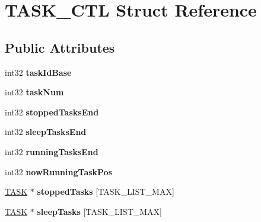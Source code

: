\hypertarget{struct_t_a_s_k___c_t_l}{}\section{T\+A\+S\+K\+\_\+\+C\+T\+L Struct Reference}
\label{struct_t_a_s_k___c_t_l}
\subsection*{Public Attributes}
\begin{DoxyCompactItemize}
\item 
\hypertarget{struct_t_a_s_k___c_t_l_a83f4422e8e6b6985fcd906280152021c}{}int32 {\bfseries task\+Id\+Base}\label{struct_t_a_s_k___c_t_l_a83f4422e8e6b6985fcd906280152021c}

\item 
\hypertarget{struct_t_a_s_k___c_t_l_afe827cc7495142a30211c673e984ffe0}{}int32 {\bfseries task\+Num}\label{struct_t_a_s_k___c_t_l_afe827cc7495142a30211c673e984ffe0}

\item 
\hypertarget{struct_t_a_s_k___c_t_l_abcd453fcf00ecb2a59a537c7a755c90b}{}int32 {\bfseries stopped\+Tasks\+End}\label{struct_t_a_s_k___c_t_l_abcd453fcf00ecb2a59a537c7a755c90b}

\item 
\hypertarget{struct_t_a_s_k___c_t_l_a2db7a15b051b387129d1a3fe9b9f379a}{}int32 {\bfseries sleep\+Tasks\+End}\label{struct_t_a_s_k___c_t_l_a2db7a15b051b387129d1a3fe9b9f379a}

\item 
\hypertarget{struct_t_a_s_k___c_t_l_a51ed809edddd6e44c3c3480fe37e764d}{}int32 {\bfseries running\+Tasks\+End}\label{struct_t_a_s_k___c_t_l_a51ed809edddd6e44c3c3480fe37e764d}

\item 
\hypertarget{struct_t_a_s_k___c_t_l_ae9de4564884d3a5f4766b85af6645121}{}int32 {\bfseries now\+Running\+Task\+Pos}\label{struct_t_a_s_k___c_t_l_ae9de4564884d3a5f4766b85af6645121}

\item 
\hypertarget{struct_t_a_s_k___c_t_l_a80753f61d7fe47df1e5bf12ca9412b68}{}\hyperlink{struct_t_a_s_k}{T\+A\+S\+K} $\ast$ {\bfseries stopped\+Tasks} \mbox{[}T\+A\+S\+K\+\_\+\+L\+I\+S\+T\+\_\+\+M\+A\+X\mbox{]}\label{struct_t_a_s_k___c_t_l_a80753f61d7fe47df1e5bf12ca9412b68}

\item 
\hypertarget{struct_t_a_s_k___c_t_l_ae4e78a4a0519a4fa491ff0304c93f0bd}{}\hyperlink{struct_t_a_s_k}{T\+A\+S\+K} $\ast$ {\bfseries sleep\+Tasks} \mbox{[}T\+A\+S\+K\+\_\+\+L\+I\+S\+T\+\_\+\+M\+A\+X\mbox{]}\label{struct_t_a_s_k___c_t_l_ae4e78a4a0519a4fa491ff0304c93f0bd}


\end{DoxyCompactItemize}
